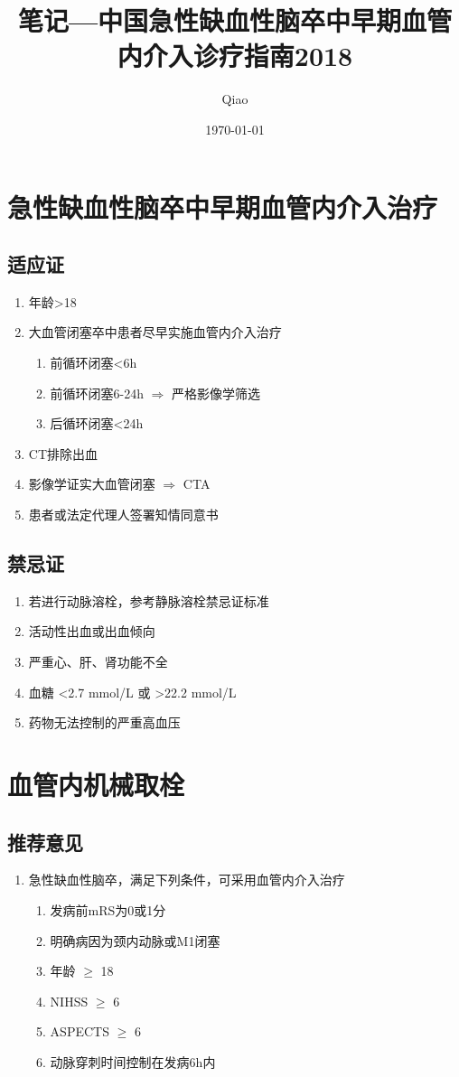 \documentclass[UTF8]{ctexart}
\begin{document}
\title{笔记---中国急性缺血性脑卒中早期血管内介入诊疗指南2018}
\author{Qiao}
\date{\today}

\maketitle

\section{急性缺血性脑卒中早期血管内介入治疗}

	\subsection{适应证}
		\begin{enumerate}
			\item 年龄>18
			\item 大血管闭塞卒中患者尽早实施血管内介入治疗
			\begin{enumerate}
				\item 前循环闭塞<6h
				\item 前循环闭塞6-24h $\Rightarrow$ 严格影像学筛选
				\item 后循环闭塞<24h
			\end{enumerate}
			\item CT排除出血
			\item 影像学证实大血管闭塞 $\Rightarrow$ CTA
			\item 患者或法定代理人签署知情同意书
		\end{enumerate}
	
	\subsection{禁忌证}
		\begin{enumerate}
			\item 若进行动脉溶栓，参考静脉溶栓禁忌证标准
			\item 活动性出血或出血倾向
			\item 严重心、肝、肾功能不全
			\item 血糖 <2.7 mmol/L 或 >22.2 mmol/L
			\item 药物无法控制的严重高血压
		\end{enumerate}

\section{血管内机械取栓}

	\subsection{推荐意见}
		\begin{enumerate}
			\item 急性缺血性脑卒，满足下列条件，可采用血管内介入治疗
			\begin{enumerate}
				\item 发病前mRS为0或1分
				\item 明确病因为颈内动脉或M1闭塞
				\item 年龄 $\geq$ 18
				\item NIHSS $\geq$ 6
				\item ASPECTS $\geq$ 6
				\item 动脉穿刺时间控制在发病6h内
			\end{enumerate}
		\end{enumerate}
\end{document}

